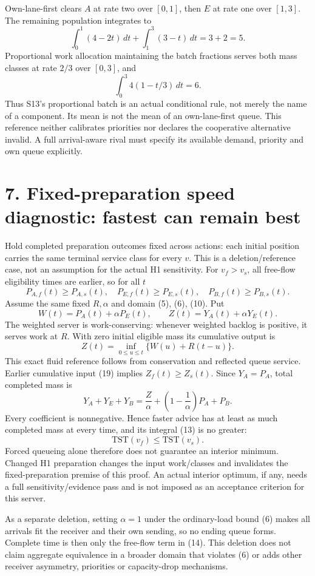 \documentclass[11pt,a4paper]{article}
\begin{document}
Own-lane-first clears $A$ at rate two over $[0,1]$, then $E$ at rate one over
$[1,3]$. The remaining population integrates to
\[
 \int_0^1(4-2t)\,dt+\int_1^3(3-t)\,dt=3+2=5.
 \tag{17}
\]
Proportional work allocation maintaining the batch fractions serves both
mass classes at rate $2/3$ over $[0,3]$, and
\[
 \int_0^3 4(1-t/3)\,dt=6.
 \tag{18}
\]
Thus S13's proportional batch is an actual conditional rule, not merely the
name of a component. Its mean is not the mean of an own-lane-first queue.
This reference neither calibrates priorities nor declares the cooperative
alternative invalid. A full arrival-aware rival must specify its available
demand, priority and own queue explicitly.

\section*{7. Fixed-preparation speed diagnostic: fastest can remain best}
Hold completed preparation outcomes fixed across actions: each initial
position carries the same terminal service class for every $v$. This is a
deletion/reference case, not an assumption for the actual H1 sensitivity.
For $v_f>v_s$, all free-flow eligibility times are earlier, so for all $t$
\[
 P_{A,f}(t)\geq P_{A,s}(t),\quad
 P_{E,f}(t)\geq P_{E,s}(t),\quad
 P_{B,f}(t)\geq P_{B,s}(t).
 \tag{19}
\]
Assume the same fixed $R,\alpha$ and domain (5), (6), (10). Put
\[
 W(t)=P_A(t)+\alpha P_E(t),\qquad
 Z(t)=Y_A(t)+\alpha Y_E(t).
\]
The weighted server is work-conserving: whenever weighted backlog is positive,
it serves work at $R$. With zero initial eligible mass its cumulative output is
\[
 Z(t)=\inf_{0\leq u\leq t}\{W(u)+R(t-u)\}.
 \tag{20}
\]
This exact fluid reference follows from conservation and reflected queue
service. Earlier cumulative input (19) implies $Z_f(t)\geq Z_s(t)$. Since
$Y_A=P_A$, total completed mass is
\[
 Y_A+Y_E+Y_B=\frac{Z}{\alpha}
                   +\left(1-\frac1\alpha\right)P_A+P_B.
 \tag{21}
\]
Every coefficient is nonnegative. Hence faster advice has at least as much
completed mass at every time, and its integral (13) is no greater:
\[
 \mathrm{TST}(v_f)\leq\mathrm{TST}(v_s).
 \tag{22}
\]
Forced queueing alone therefore does not guarantee an interior minimum.
Changed H1 preparation changes the input work/classes and invalidates the
fixed-preparation premise of this proof. An actual interior optimum, if any,
needs a full sensitivity/evidence pass and is not imposed as an acceptance
criterion for this server.

As a separate deletion, setting $\alpha=1$ under the ordinary-load bound (6)
makes all arrivals fit the receiver and their own sending, so no ending queue
forms. Complete time is then only the free-flow term in (14). This deletion
does not claim aggregate equivalence in a broader domain that violates (6)
or adds other receiver asymmetry, priorities or capacity-drop mechanisms.
\end{document}
